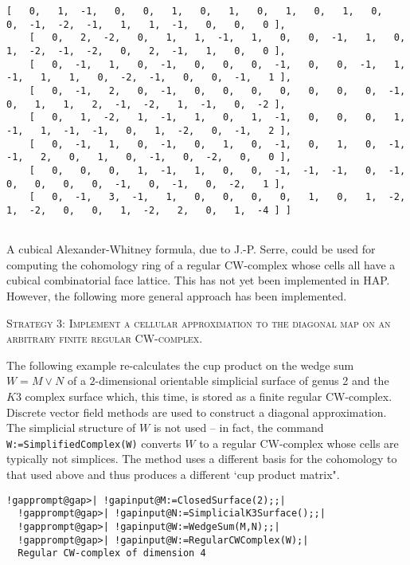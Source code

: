 \documentclass[a4paper,11pt]{report}
\begin{document}
{{\begin{Verbatim}[commandchars=!@|,fontsize=\small,frame=single,label=Example]
    [   0,   1,  -1,   0,   0,   1,   0,   1,   0,   1,   0,   1,   0,   0,  -1,  -2,  -1,   1,   1,  -1,   0,   0,   0 ],
    [   0,   2,  -2,   0,   1,   1,  -1,   1,   0,   0,  -1,   1,   0,   1,  -2,  -1,  -2,   0,   2,  -1,   1,   0,   0 ],
    [   0,  -1,   1,   0,  -1,   0,   0,   0,  -1,   0,   0,  -1,   1,  -1,   1,   1,   0,  -2,  -1,   0,   0,  -1,   1 ],
    [   0,  -1,   2,   0,  -1,   0,   0,   0,   0,   0,   0,   0,  -1,   0,   1,   1,   2,  -1,  -2,   1,  -1,   0,  -2 ],
    [   0,   1,  -2,   1,  -1,   1,   0,   1,  -1,   0,   0,   0,   1,  -1,   1,  -1,  -1,   0,   1,  -2,   0,  -1,   2 ],
    [   0,  -1,   1,   0,  -1,   0,   1,   0,  -1,   0,   1,   0,  -1,  -1,   2,   0,   1,   0,  -1,   0,  -2,   0,   0 ],
    [   0,   0,   0,   1,  -1,   1,   0,   0,  -1,  -1,  -1,   0,  -1,   0,   0,   0,   0,  -1,   0,  -1,   0,  -2,   1 ],
    [   0,  -1,   3,  -1,   1,   0,   0,   0,   0,   1,   0,   1,  -2,   1,  -2,   0,   0,   1,  -2,   2,   0,   1,  -4 ] ]
  
\end{Verbatim}
 A cubical Alexander-Whitney formula, due to J.-P. Serre, could be used for
computing the cohomology ring of a regular CW-complex whose cells all have a
cubical combinatorial face lattice. This has not yet been implemented in HAP.
However, the following more general approach has been implemented. 

\textsc{Strategy 3: Implement a cellular approximation to the diagonal map on an
arbitrary finite regular CW-complex.} 

The following example re-calculates the cup product on the wedge sum $W=M\vee N$ of a $2$-dimensional orientable simplicial surface of genus 2 and the $K3$ complex surface which, this time, is stored as a finite regular CW-complex.
Discrete vector field methods are used to construct a diagonal approximation.
The simplicial structure of $W$ is not used -- in fact, the command \texttt{W:=SimplifiedComplex(W)} converts $W$ to a regular CW-complex whose cells are typically not simplices. The method
uses a different basis for the cohomology to that used above and thus produces
a different `cup product matrix". 
\begin{Verbatim}[commandchars=!@|,fontsize=\small,frame=single,label=Example]
  !gapprompt@gap>| !gapinput@M:=ClosedSurface(2);;|
  !gapprompt@gap>| !gapinput@N:=SimplicialK3Surface();;|
  !gapprompt@gap>| !gapinput@W:=WedgeSum(M,N);;|
  !gapprompt@gap>| !gapinput@W:=RegularCWComplex(W);|
  Regular CW-complex of dimension 4
  

\end{Verbatim}}}
\end{document}
